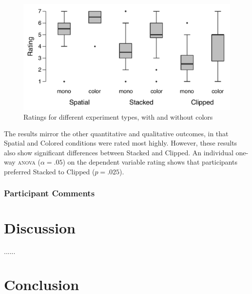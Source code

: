 \documentclass{tufte-book} %
\begin{document}
\begin{figure}
  \includegraphics{post-color.pdf}
  \caption{Ratings for different experiment types, with and without colors}
  \label{fig:post-color}
\end{figure}

The results mirror the other quantitative and qualitative outcomes, in that Spatial and Colored conditions were rated most highly. However, these results also show significant differences between Stacked and Clipped. An individual one-way \textsc{anova} ($\alpha = .05$) on the dependent variable rating shows that participants preferred Stacked to Clipped ($p = .025$).


\subsection{Participant Comments}



\chapter{Discussion}
\label{ch:discussion}


......


\chapter{Conclusion}
\label{ch:conclusion}
\end{document}
